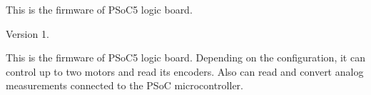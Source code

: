 This is the firmware of P\+So\+C5 logic board. \begin{DoxyVersion}{Version}
1.
\end{DoxyVersion}
This is the firmware of P\+So\+C5 logic board. Depending on the configuration, it can control up to two motors and read its encoders. Also can read and convert analog measurements connected to the P\+SoC microcontroller. 
